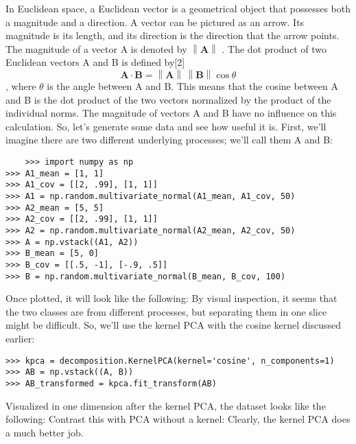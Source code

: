 \documentclass[SKL-MASTER.tex]{subfiles}
\begin{document}
In Euclidean space, a Euclidean vector is a geometrical object that possesses both a magnitude and a direction. A vector can be pictured as an arrow. Its magnitude is its length, and its direction is the direction that the arrow points. The magnitude of a vector A is denoted by $ \left\| \mathbf{A} \right\|$ . The dot product of two Euclidean vectors A and B is defined by[2]
\[\mathbf A \cdot \mathbf B = \left\| \mathbf A \right\| \, \left\| \mathbf B \right\| \cos \theta \],
where $\theta$ is the angle between A and B.
This means that the cosine between A and B is the dot product of the two vectors normalized
by the product of the individual norms. The magnitude of vectors A and B have no influence on
this calculation.
So, let's generate some data and see how useful it is. First, we'll imagine there are two
different underlying processes; we'll call them A and B:
\begin{framed}
	\begin{verbatim}
	>>> import numpy as np
>>> A1_mean = [1, 1]
>>> A1_cov = [[2, .99], [1, 1]]
>>> A1 = np.random.multivariate_normal(A1_mean, A1_cov, 50)
>>> A2_mean = [5, 5]
>>> A2_cov = [[2, .99], [1, 1]]
>>> A2 = np.random.multivariate_normal(A2_mean, A2_cov, 50)
>>> A = np.vstack((A1, A2))
>>> B_mean = [5, 0]
>>> B_cov = [[.5, -1], [-.9, .5]]
>>> B = np.random.multivariate_normal(B_mean, B_cov, 100)
\end{verbatim}
\end{framed}
Once plotted, it will look like the following:
By visual inspection, it seems that the two classes are from different processes, but separating
them in one slice might be difficult. So, we'll use the kernel PCA with the cosine kernel
discussed earlier:
\begin{framed}
\begin{verbatim}
>>> kpca = decomposition.KernelPCA(kernel='cosine', n_components=1)
>>> AB = np.vstack((A, B))
>>> AB_transformed = kpca.fit_transform(AB)
\end{verbatim}
\end{framed}
Visualized in one dimension after the kernel PCA, the dataset looks like the following:
Contrast this with PCA without a kernel:
Clearly, the kernel PCA does a much better job.
\end{document}
